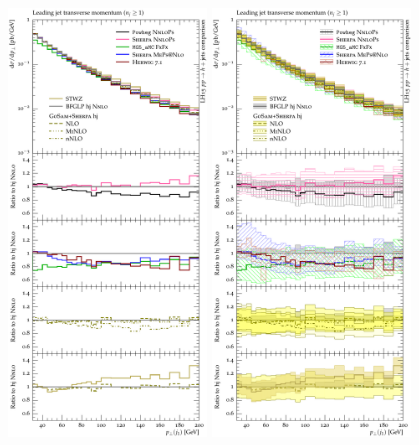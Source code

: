 \begin{figure}[t!]
  \centering
  \includegraphics[width=0.47\textwidth]{figures/hjetscomp_u_jet1_pT_incl.pdf}
  \hfill
  \includegraphics[width=0.47\textwidth]{figures/hjetscomp_jet1_pT_incl.pdf}

\end{figure}
